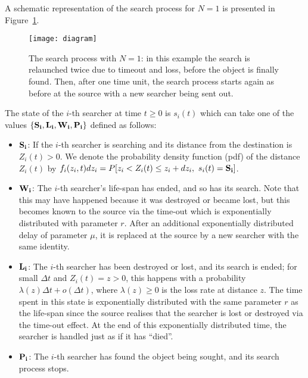 \documentclass[journal]{IEEEtran}
\begin{document}
A schematic representation of the search process for $N=1$ is presented in Figure~\ref{diagram}. \begin{figure}[t]\centering
   \texttt{[image: diagram]}
   \caption{The search process with $N=1$: in this example the search is relaunched twice due to timeout and loss, before the object is finally found. Then, after one time unit, the search process starts again as before at the source with a new searcher being sent out.} \label{diagram}
\end{figure}The state of the $i$-th searcher at time $t\geq 0$ is $s_i(t)$ which can take one of the values $\{{\bf S_i,L_i,W_i,P_i}\}$ defined as follows:
\begin{itemize}
\item $\bf S_i$: If the $i$-th searcher is searching and its distance from the destination is $Z_i(t)>0$. We denote the probability density function (pdf) of the distance $Z_i(t)$ by $f_i(z_i,t)dz_i=P[z_i<Z_i(t)\leq z_i+dz_i, ~s_i(t)={\bf S_i}]$.

\item $\bf W_i$: The $i$-th searcher's life-span has ended, and so has its search. Note that this may have happened because it was destroyed or became lost, but this becomes known to the source via the time-out which is exponentially distributed with parameter $r$. After an additional exponentially distributed delay of parameter $\mu$, it is replaced at the source by a new searcher with the same identity.

\item $\bf L_i$: The $i$-th searcher has been destroyed or lost, and its search is ended; for small $\Delta t$ and $Z_i(t)=z>0$, this happens with a probability $\lambda(z) \Delta t + o(\Delta t)$, where $\lambda(z)\geq 0$ is the loss rate at distance $z$. The time spent in this state is exponentially distributed with the same parameter $r$ as the life-span since the source realises that the searcher is lost or destroyed via the time-out effect. At the end of this exponentially distributed time, the searcher is handled just as if it has ``died''.
\item $\bf P_i$: The $i$-th searcher has found the object being sought, and its search process stops.
\end{itemize}
\end{document}
